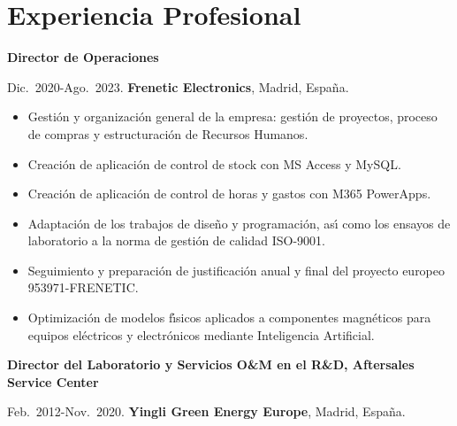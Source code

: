 \documentclass{article}
\begin{document}

\section*{Experiencia Profesional}

{\bf Director de Operaciones}

\medskip
Dic.~2020-Ago.~2023.
{\bf Frenetic Electronics},
Madrid, Espa\~na.

\begin{itemize}\itemsep 0pt
	\item Gesti\'on y organizaci\'on general de la empresa: gesti\'on de proyectos, proceso de compras y estructuraci\'on de Recursos Humanos.
	\item Creaci\'on de aplicaci\'on de control de stock con MS Access y MySQL.
	\item Creaci\'on de aplicaci\'on de control de horas y gastos con M365 PowerApps.
	\item Adaptaci\'on de los trabajos de dise\~no y programaci\'on, as{\'\i} como los ensayos de laboratorio a la norma de gesti\'on de calidad ISO-9001.
	\item Seguimiento y preparaci\'on de justificaci\'on anual y final del proyecto europeo 953971-FRENETIC.
	\item Optimizaci\'on de modelos f\'{\i}sicos aplicados a componentes magn\'eticos para equipos el\'ectricos y electr\'onicos mediante Inteligencia Artificial.
\end{itemize}

\newpage

{\bf Director del Laboratorio y Servicios O{\&}M en el R{\&}D, Aftersales Service Center}

\medskip
Feb.~2012-Nov.~2020.
{\bf Yingli Green Energy Europe},
Madrid, Espa\~na.
\end{document}
